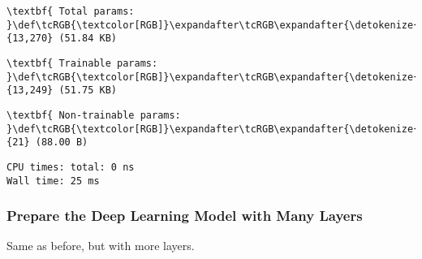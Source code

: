 \documentclass[11pt]{article}
\begin{document}
\begin{Verbatim}[commandchars=\\\{\}]
    \end{Verbatim}

    
    
    \begin{Verbatim}[commandchars=\\\{\}]
\textbf{ Total params: }\def\tcRGB{\textcolor[RGB]}\expandafter\tcRGB\expandafter{\detokenize{0,175,0}}{13,270} (51.84 KB)

    \end{Verbatim}

    
    
    \begin{Verbatim}[commandchars=\\\{\}]
\textbf{ Trainable params: }\def\tcRGB{\textcolor[RGB]}\expandafter\tcRGB\expandafter{\detokenize{0,175,0}}{13,249} (51.75 KB)

    \end{Verbatim}

    
    
    \begin{Verbatim}[commandchars=\\\{\}]
\textbf{ Non-trainable params: }\def\tcRGB{\textcolor[RGB]}\expandafter\tcRGB\expandafter{\detokenize{0,175,0}}{21} (88.00 B)

    \end{Verbatim}

    
    \begin{Verbatim}[commandchars=\\\{\}]
CPU times: total: 0 ns
Wall time: 25 ms
    \end{Verbatim}

    \subsubsection{Prepare the Deep Learning Model with Many
Layers}\label{prepare-the-deep-learning-model-with-many-layers}

Same as before, but with more layers.
\end{document}

